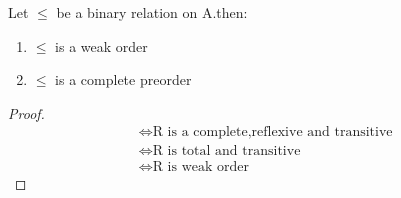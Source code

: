 \documentclass[cn,10pt,math=newtx,citestyle=gb7714-2015,bibstyle=gb7714-2015]{elegantbook}
\begin{document}
\begin{theorem}
    Let $\leq$ be a binary relation on A.then:
    \begin{enumerate}
        \item $\leq$ is a weak order
        \item $\leq$ is a complete preorder
    \end{enumerate}
\end{theorem}
\begin{proof}
    \begin{align*}
        &\Leftrightarrow \text{R is a complete,reflexive and transitive}\\
        &\Leftrightarrow \text{R is total and transitive} \\
        &\Leftrightarrow \text{R is weak order}
    \end{align*}
\end{proof}
\end{document}
